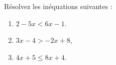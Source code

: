 %
%
%
\begin{exr} Résolvez les inéquations suivantes :
  \begin{multicols}{3}
    \begin{enumerate}[label=\textbf{\alph*.}]
    \item $2-5x<6x-1$.
    \item $3x-4>-2x+8$,
    \item $4x+5\leqslant8x+4$.
    \end{enumerate}
  \end{multicols}
\end{exr}